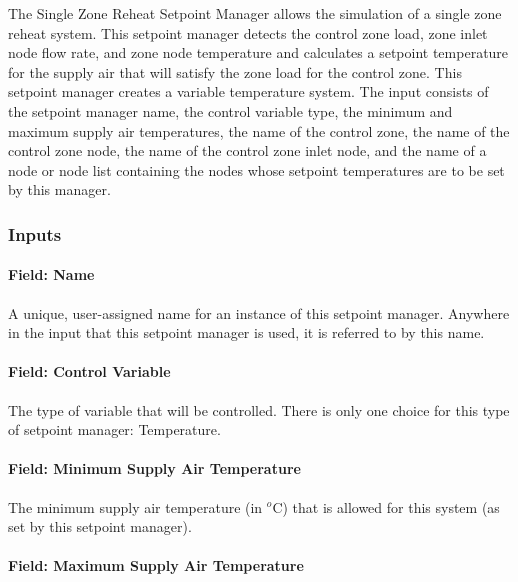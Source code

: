 The Single Zone Reheat Setpoint Manager allows the simulation of a single zone reheat system. This setpoint manager detects the control zone load, zone inlet node flow rate, and zone node temperature and calculates a setpoint temperature for the supply air that will satisfy the zone load for the control zone. This setpoint manager creates a variable temperature system. The input consists of the setpoint manager name, the control variable type, the minimum and maximum supply air temperatures, the name of the control zone, the name of the control zone node, the name of the control zone inlet node, and the name of a node or node list containing the nodes whose setpoint temperatures are to be set by this manager.

\subsubsection{Inputs}\label{inputs-3-033}

\paragraph{Field: Name}\label{field-name-3-029}

A unique, user-assigned name for an instance of this setpoint manager. Anywhere in the input that this setpoint manager is used, it is referred to by this name.

\paragraph{Field: Control Variable}\label{field-control-variable-3}

The type of variable that will be controlled. There is only one choice for this type of setpoint manager: Temperature.

\paragraph{Field: Minimum Supply Air Temperature}\label{field-minimum-supply-air-temperature}

The minimum supply air temperature (in \(^{o}\)C) that is allowed for this system (as set by this setpoint manager).

\paragraph{Field: Maximum Supply Air Temperature}\label{field-maximum-supply-air-temperature}

